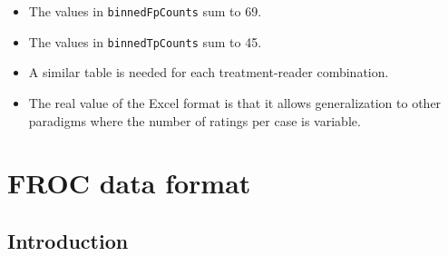 \documentclass[]{book}
\providecommand{\tightlist}{%
  \setlength{\itemsep}{0pt}\setlength{\parskip}{0pt}}
\begin{document}
\begin{itemize}
\tightlist
\item
  The values in \texttt{binnedFpCounts} sum to 69.
\item
  The values in \texttt{binnedTpCounts} sum to 45.
\item
  A similar table is needed for each treatment-reader combination.
\item
  The real value of the Excel format is that it allows generalization to other paradigms where the number of ratings per case is variable.
\end{itemize}

\hypertarget{frocdataformat}{%
\chapter{FROC data format}\label{frocdataformat}}

\hypertarget{introduction-1}{%
\section{Introduction}\label{introduction-1}}
\end{document}
